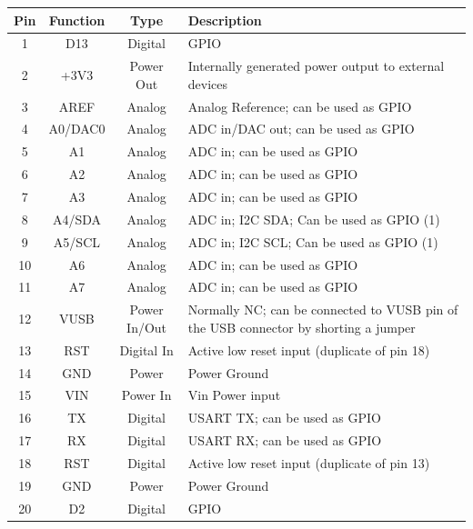 \begin{table}[H]
    \centering
    \begin{tabular}{|c|c|c|p{8cm}|}
        \hline
        \textbf{Pin} & \textbf{Function} & \textbf{Type} & \textbf{Description} \\
        \hline
        1 & D13 & Digital & GPIO \\
        \hline
        2 & +3V3 & Power Out & Internally generated power output to external devices \\
        \hline
        3 & AREF & Analog & Analog Reference; can be used as GPIO \\
        \hline
        4 & A0/DAC0 & Analog & ADC in/DAC out; can be used as GPIO \\
        \hline
        5 & A1 & Analog & ADC in; can be used as GPIO \\
        \hline
        6 & A2 & Analog & ADC in; can be used as GPIO \\
        \hline
        7 & A3 & Analog & ADC in; can be used as GPIO \\
        \hline
        8 & A4/SDA & Analog & ADC in; I2C SDA; Can be used as GPIO (1) \\
        \hline
        9 & A5/SCL & Analog & ADC in; I2C SCL; Can be used as GPIO (1) \\
        \hline
        10 & A6 & Analog & ADC in; can be used as GPIO \\
        \hline
        11 & A7 & Analog & ADC in; can be used as GPIO \\
        \hline
        12 & VUSB & Power In/Out & Normally NC; can be connected to VUSB pin of the USB connector by shorting a jumper \\
        \hline
        13 & RST & Digital In & Active low reset input (duplicate of pin 18) \\
        \hline
        14 & GND & Power & Power Ground \\
        \hline
        15 & VIN & Power In & Vin Power input \\
        \hline
        16 & TX & Digital & USART TX; can be used as GPIO \\
        \hline
        17 & RX & Digital & USART RX; can be used as GPIO \\
        \hline
        18 & RST & Digital & Active low reset input (duplicate of pin 13) \\
        \hline
        19 & GND & Power & Power Ground \\
        \hline
        20 & D2 & Digital & GPIO \\

\end{tabular}
\end{table}
